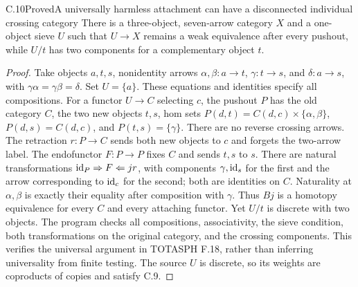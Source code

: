 \begin{statement}{C.10}{Proved}{A universally harmless attachment can have a disconnected individual crossing category}
There is a three-object, seven-arrow category $X$ and a one-object sieve $U$ such that $U\to X$ remains a weak equivalence after every pushout, while $U/t$ has two components for a complementary object $t$.
\end{statement}
\begin{proof}
Take objects $a,t,s$, nonidentity arrows $\alpha,\beta:a\to t$, $\gamma:t\to s$, and $\delta:a\to s$, with $\gamma\alpha=\gamma\beta=\delta$. Set $U=\{a\}$. These equations and identities specify all compositions. For a functor $U\to C$ selecting $c$, the pushout $P$ has the old category $C$, the two new objects $t,s$, hom sets $P(d,t)=C(d,c)\times\{\alpha,\beta\}$, $P(d,s)=C(d,c)$, and $P(t,s)=\{\gamma\}$. There are no reverse crossing arrows. The retraction $r:P\to C$ sends both new objects to $c$ and forgets the two-arrow label. The endofunctor $F:P\to P$ fixes $C$ and sends $t,s$ to $s$. There are natural transformations $\mathrm{id}_P\Rightarrow F\Leftarrow jr$, with components $\gamma,\mathrm{id}_s$ for the first and the arrow corresponding to $\mathrm{id}_c$ for the second; both are identities on $C$. Naturality at $\alpha,\beta$ is exactly their equality after composition with $\gamma$. Thus $Bj$ is a homotopy equivalence for every $C$ and every attaching functor. Yet $U/t$ is discrete with two objects. The program checks all compositions, associativity, the sieve condition, both transformations on the original category, and the crossing components. This verifies the universal argument in TOTASPH F.18, rather than inferring universality from finite testing. The source $U$ is discrete, so its weights are coproducts of copies and satisfy C.9.
\end{proof}

